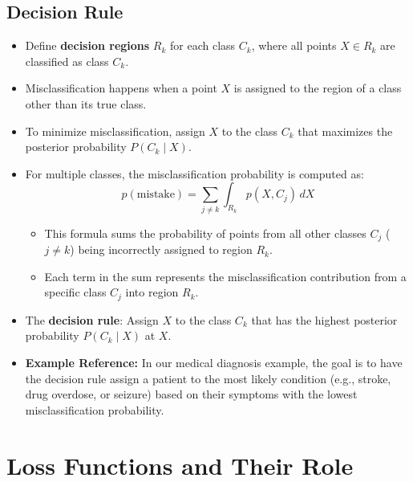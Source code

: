 \documentclass[12pt]{article}
\begin{document}
\subsection{Decision Rule}

\begin{itemize}
    \item Define \textbf{decision regions} $R_k$ for each class $C_k$, where all points $X \in R_k$ are classified as class $C_k$.
    \item Misclassification happens when a point $X$ is assigned to the region of a class other than its true class.
    \item To minimize misclassification, assign $X$ to the class $C_k$ that maximizes the posterior probability $P(C_k \mid X)$.
    \item For multiple classes, the misclassification probability is computed as:
    \[
    p(\text{mistake}) = \sum_{j \neq k} \int_{R_k} p(X, C_j)\, dX
    \]
    \begin{itemize}
        \item This formula sums the probability of points from all other classes $C_j$ (\(j \neq k\)) being incorrectly assigned to region $R_k$.
        \item Each term in the sum represents the misclassification contribution from a specific class $C_j$ into region $R_k$.
    \end{itemize}
    \item The \textbf{decision rule}: Assign $X$ to the class $C_k$ that has the highest posterior probability $P(C_k \mid X)$ at $X$.
    \item \textbf{Example Reference:} In our medical diagnosis example, the goal is to have the decision rule assign a patient to the most likely condition (e.g., stroke, drug overdose, or seizure) based on their symptoms with the lowest misclassification probability.

\end{itemize}

\section{Loss Functions and Their Role}
\end{document}
